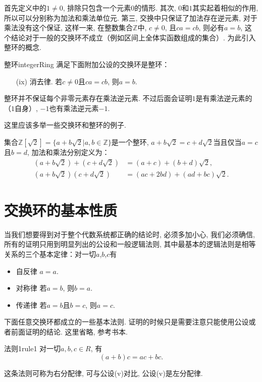 首先定义中的$1 \neq 0$, 排除只包含一个元素$0$的情形. 其次, $0$和$1$其实起着相似的作用, 所以可以分别称为加法和乘法单位元. 第三, 交换中只保证了加法存在逆元素, 对于乘法没有这个保证, 这样一来, 在整数集合$\mathbb{Z}$中, $c \neq 0$, 且$ca=cb$, 则必有$a=b$, 这个结论对于一般的交换环不成立（例如区间上全体实函数组成的集合）. 为此引入整环的概念. 
\begin{definition}{整环}{integerRing} 
满足下面附加公设的交换环是整环：
\begin{enumerate}
\item[(ix)] 消去律. 若$c \neq 0$且$ca=cb$, 则$a=b$.
\end{enumerate}
\end{definition}

整环并不保证每个非零元素存在乘法逆元素. 不过后面会证明$1$是有乘法逆元素的（$1$自身）, $-1$也有乘法逆元素$-1$. 

这里应该多举一些交换环和整环的例子. 

集合$\mathbb{Z}[\sqrt{2}] = \{a+b\sqrt{2} | a,b \in \mathbb{Z}\}$是一个整环, $a+b\sqrt{2}=c+d\sqrt{2}$当且仅当$a=c$且$b=d$, 加法和乘法分别定义为：
\[
\begin{aligned}
(a + b\sqrt{2}) + (c + d\sqrt{2}) &= (a+c) + (b+d)\sqrt{2}, \\
(a + b\sqrt{2})(c + d\sqrt{2})&=(ac+2bd)+(ad+bc)\sqrt{2}.
\end{aligned}
\]


\section{交换环的基本性质}\label{section0010102}
当我们想要得到对于整个代数系统都正确的结论时, 必须多加小心, 我们必须确信, 所有的证明只用到明显列出的公设和一般逻辑法则, 其中最基本的逻辑法则是相等关系的三个基本定律：对一切$a$,$b$,$c$有
\begin{itemize}
\item 自反律 $a=a$.
\item 对称律 若$a=b$, 则$b=a$.
\item 传递律 若$a=b$且$b=c$, 则$a=c$.
\end{itemize}

下面任意交换环都成立的一些基本法则.  证明的时候只是需要注意只能使用公设或者前面证明的结论. 这里省略, 参考书本. 

\begin{corollary}{法则1}{rule1}
对一切$a,b,c \in R$, 有
\[
(a+b)c = ac + bc.
\]
\end{corollary}

这条法则可称为右分配律, 可与公设(v)对比, 公设(v)是左分配律. 

